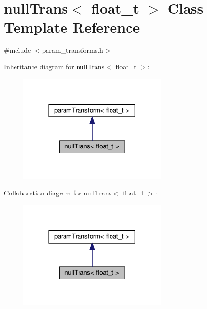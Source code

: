 \hypertarget{classnullTrans}{}\section{null\+Trans$<$ float\+\_\+t $>$ Class Template Reference}
\label{classnullTrans}


{\ttfamily \#include $<$param\+\_\+transforms.\+h$>$}



Inheritance diagram for null\+Trans$<$ float\+\_\+t $>$\+:
\nopagebreak
\begin{figure}[H]
\begin{center}
\leavevmode
\includegraphics[width=213pt]{classnullTrans__inherit__graph}
\end{center}
\end{figure}


Collaboration diagram for null\+Trans$<$ float\+\_\+t $>$\+:
\nopagebreak
\begin{figure}[H]
\begin{center}
\leavevmode
\includegraphics[width=213pt]{classnullTrans__coll__graph}
\end{center}
\end{figure}
